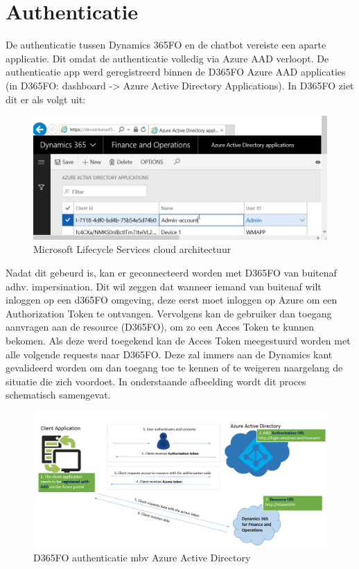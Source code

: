 \section{Authenticatie}
De authenticatie tussen Dynamics 365FO en de chatbot vereiste een aparte applicatie. Dit omdat de authenticatie volledig via Azure AAD verloopt. De authenticatie app werd geregistreerd binnen de D365FO Azure AAD applicaties (in D365FO: dashboard -> Azure Active Directory Applications). In D365FO ziet dit er als volgt uit: 
\begin{figure}[H]
    \centering
    \includegraphics[width=1\textwidth]{img/impersination.png}
    \caption{Microsoft Lifecycle Services cloud architectuur}
\end{figure}
Nadat dit gebeurd is, kan er geconnecteerd worden met D365FO van buitenaf adhv. impersination. 
Dit wil zeggen dat wanneer iemand van buitenaf wilt inloggen op een d365FO omgeving, deze eerst moet inloggen op Azure om een Authorization Token te ontvangen. Vervolgens kan de gebruiker dan toegang aanvragen aan de resource (D365FO), om zo een Acces Token te kunnen bekomen. Als deze werd toegekend kan de Acces Token meegestuurd worden met alle volgende requests naar D365FO. Deze zal immers aan de Dynamics kant gevalideerd worden om dan toegang toe te kennen of te weigeren naargelang de situatie die zich voordoet. In onderstaande afbeelding wordt dit proces schematisch samengevat.

\begin{figure}[H]
    \centering
    \includegraphics[width=1\textwidth]{img/aadAuthenticationArchitecture.png}
    \caption{D365FO authenticatie mbv Azure Active Directory}
\end{figure}
